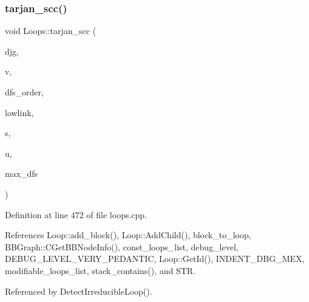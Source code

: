 \subsubsection{\texorpdfstring{tarjan\+\_\+scc()}{tarjan\_scc()}}
{\footnotesize\ttfamily void Loops\+::tarjan\+\_\+scc (\begin{DoxyParamCaption}\item[{const \hyperlink{basic__block_8hpp_a0e7f233d1b83cad0bfd5aa865f0d3532}{B\+B\+Graph\+Ref}}]{djg,  }\item[{\hyperlink{graph_8hpp_abefdcf0544e601805af44eca032cca14}{vertex}}]{v,  }\item[{\hyperlink{custom__map_8hpp_ad1ed68f2ff093683ab1a33522b144adc}{Custom\+Unordered\+Map}$<$ \hyperlink{graph_8hpp_abefdcf0544e601805af44eca032cca14}{vertex}, unsigned int $>$ \&}]{dfs\+\_\+order,  }\item[{\hyperlink{custom__map_8hpp_ad1ed68f2ff093683ab1a33522b144adc}{Custom\+Unordered\+Map}$<$ \hyperlink{graph_8hpp_abefdcf0544e601805af44eca032cca14}{vertex}, unsigned int $>$ \&}]{lowlink,  }\item[{std\+::list$<$ \hyperlink{graph_8hpp_abefdcf0544e601805af44eca032cca14}{vertex} $>$ \&}]{s,  }\item[{\hyperlink{classCustomOrderedSet}{Custom\+Ordered\+Set}$<$ \hyperlink{graph_8hpp_abefdcf0544e601805af44eca032cca14}{vertex} $>$ \&}]{u,  }\item[{unsigned int \&}]{max\+\_\+dfs }\end{DoxyParamCaption})\hspace{0.3cm}{\ttfamily [private]}}



Definition at line 472 of file loops.\+cpp.



References Loop\+::add\+\_\+block(), Loop\+::\+Add\+Child(), block\+\_\+to\+\_\+loop, B\+B\+Graph\+::\+C\+Get\+B\+B\+Node\+Info(), const\+\_\+loops\+\_\+list, debug\+\_\+level, D\+E\+B\+U\+G\+\_\+\+L\+E\+V\+E\+L\+\_\+\+V\+E\+R\+Y\+\_\+\+P\+E\+D\+A\+N\+T\+IC, Loop\+::\+Get\+Id(), I\+N\+D\+E\+N\+T\+\_\+\+D\+B\+G\+\_\+\+M\+EX, modifiable\+\_\+loops\+\_\+list, stack\+\_\+contains(), and S\+TR.



Referenced by Detect\+Irreducible\+Loop().

